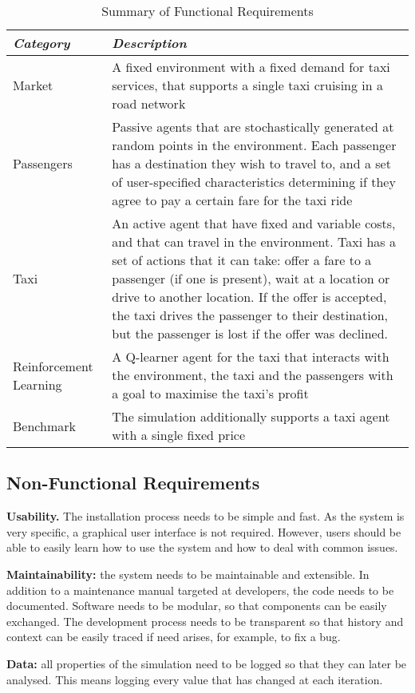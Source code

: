 \begin{table}
\begin{tabular}{| p{} | p{} |}
  \hline

  \textit{Category} & \textit{Description} \\ \hline
  
  Market & A fixed environment with a fixed demand for taxi
  services, that supports a single taxi cruising in a road network \\ \hline

  Passengers & Passive agents that are stochastically generated at random
  points in the environment. Each passenger has a destination they wish to
  travel to, and a set of user-specified characteristics determining if they
  agree to pay a certain fare for the taxi ride \\ \hline

  Taxi & An active agent that have fixed and variable costs, and that can 
  travel in the environment. Taxi has a set of actions that it can take: offer 
  a fare to a passenger (if one is present), wait at a location or drive to
  another location. If the offer is accepted, the taxi drives the passenger to
  their destination, but the passenger is lost if the offer was declined. \\
  \hline

  Reinforcement Learning & A Q-learner agent for the taxi that interacts with
  the environment, the taxi and the passengers with a goal to maximise the
  taxi's profit \\ \hline

  Benchmark & The simulation additionally supports a taxi agent with a single
  fixed price \\
  \hline
\end{tabular}
\caption{
  Summary of Functional Requirements
  \label{table:requirements}
}
\end{table}

\subsection{Non-Functional Requirements}

\textbf{Usability.} The installation process needs to be simple and fast. As
the system is very specific, a graphical user interface is not required.
However, users should be able to easily learn how to use the system and how to
deal with common issues.

\textbf{Maintainability:} the system needs to be maintainable and extensible.
In addition to a maintenance manual targeted at developers, the code needs to
be documented. Software needs to be modular, so that components can be easily
exchanged. The development process needs to be transparent so that history and
context can be easily traced if need arises, for example, to fix a bug.

\textbf{Data:} all properties of the simulation need to be logged so that they
can later be analysed. This means logging every value that has changed at each
iteration.
